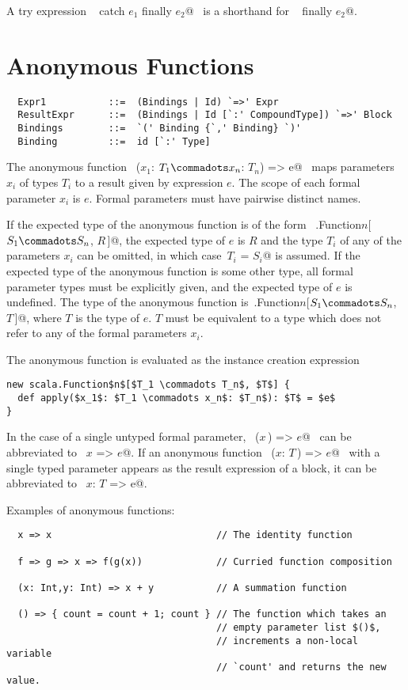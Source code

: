 A try expression ~ catch $e_1$ finally $e_2$@~ 
is a shorthand
for  ~ finally $e_2$@.

\section{Anonymous Functions}
\label{sec:closures}

\syntax\begin{lstlisting}
  Expr1           ::=  (Bindings | Id) `=>' Expr
  ResultExpr      ::=  (Bindings | Id [`:' CompoundType]) `=>' Block
  Bindings        ::=  `(' Binding {`,' Binding} `)'
  Binding         ::=  id [`:' Type]
\end{lstlisting}

The anonymous function ~\lstinline@($x_1$: $T_1 \commadots x_n$: $T_n$) => e@~ 
maps parameters $x_i$ of types $T_i$ to a result given
by expression $e$. The scope of each formal parameter
$x_i$ is $e$. Formal parameters must have pairwise distinct names.

If the expected type of the anonymous function is of the form
~\lstinline@scala.Function$n$[$S_1 \commadots S_n$, $R\,$]@, the
expected type of $e$ is $R$ and the type $T_i$ of any of the
parameters $x_i$ can be omitted, in which
case~\lstinline@$T_i$ = $S_i$@ is assumed.
If the expected type of the anonymous function is
some other type, all formal parameter types must be explicitly given,
and the expected type of $e$ is undefined. The type of the anonymous
function
is~\lstinline@scala.Function$n$[$S_1 \commadots S_n$, $T\,$]@,
where $T$ is the type of $e$. $T$ must be equivalent to a
type which does not refer to any of the formal parameters $x_i$.

The anonymous function is evaluated as the instance creation expression
\begin{lstlisting}
new scala.Function$n$[$T_1 \commadots T_n$, $T$] {
  def apply($x_1$: $T_1 \commadots x_n$: $T_n$): $T$ = $e$
}
\end{lstlisting}
In the case of a single untyped formal parameter, 
~\lstinline@($x\,$) => $e$@~ 
can be abbreviated to ~\lstinline@$x$ => $e$@. If an
anonymous function ~\lstinline@($x$: $T\,$) => $e$@~ with a single
typed parameter appears as the result expression of a block, it can be
abbreviated to ~\lstinline@$x$: $T$ => e@.

\example Examples of anonymous functions:

\begin{lstlisting}
  x => x                             // The identity function

  f => g => x => f(g(x))             // Curried function composition

  (x: Int,y: Int) => x + y           // A summation function

  () => { count = count + 1; count } // The function which takes an
                                     // empty parameter list $()$, 
                                     // increments a non-local variable 
                                     // `count' and returns the new value.
\end{lstlisting}

